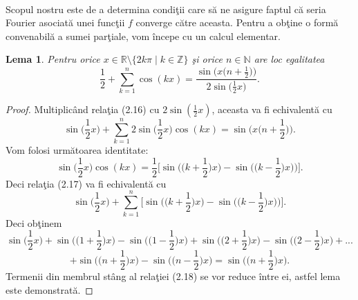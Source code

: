 \documentclass[a4paper,openany,12pt]{report}
\newtheorem{lemma}{Lema}[section]
\begin{document}
\paragraph*{}Scopul nostru este de a determina condi\c tii care s\u a ne asigure faptul c\u a seria Fourier asociat\u a unei func\c tii $f$ converge c\u atre aceasta. Pentru a ob\c tine o form\u a convenabil\u a a sumei par\c tiale, vom \^ incepe cu un calcul elementar. 
\begin{lemma}Pentru orice $x \in \mathbb{R}\setminus \{2k\pi \mid k \in \mathbb{Z}\}$ \c si orice $n \in \mathbb{N}$ are loc egalitatea
\begin{equation}
\frac{1}{2} + \sum_{k=1}^{n}\cos(kx) = \frac{\sin\Big(x\big(n + \frac{1}{2}\big)\Big)}{2\sin\Big(\frac{1}{2}x\Big)}.
\end{equation}
\end{lemma}
\begin{proof} 
Multiplic\^ and rela\c tia (2.16) cu $2\sin(\frac{1}{2}x)$, aceasta va fi echivalent\u a cu
\begin{equation}
\sin\Big(\frac{1}{2}x\Big) + \sum_{k=1}^n 2\sin\Big(\frac{1}{2}x\Big)\cos(kx)  = \sin\Big(x\Big(n + \frac{1}{2}\Big)\Big).
\end{equation}
Vom folosi urm\u atoarea identitate:
\begin{equation*}
\sin\Big(\frac{1}{2}x\Big)\cos(kx) = \frac{1}{2}\Big[\sin\Big(\Big(k + \frac{1}{2}\Big)x\Big) - \sin\Big(\Big(k - \frac{1}{2}\Big)x\Big)\Big) \Big].
\end{equation*}
Deci rela\c tia (2.17) va fi echivalent\u a cu
\begin{equation*}
\sin\Big(\frac{1}{2}x\Big) + \sum_{k=1}^{n}{\Big[\sin\Big(\Big(k + \frac{1}{2}\Big)x\Big) - \sin\Big(\Big(k - \frac{1}{2}\Big)x\Big)\Big) \Big]}. 
\end{equation*}
Deci ob\c tinem
\begin{equation*}
\sin\Big(\frac{1}{2}x\Big) + \sin\Big(\Big(1+\frac{1}{2}\Big)x\Big) - \sin\Big(\Big(1-\frac{1}{2}\Big)x\Big)  + \sin\Big(\Big(2+\frac{1}{2}\Big)x\Big) -\sin\Big(\Big(2-\frac{1}{2}\Big)x\Big) + ... 
\end{equation*}
\begin{equation}
+\sin\Big(\Big(n+\frac{1}{2}\Big)x\Big)  - \sin\Big(\Big(n-\frac{1}{2}\Big)x\Big)  = \sin\Big(\Big(n+\frac{1}{2}\Big)x\Big).
\end{equation}
Termenii din membrul st\^ ang al rela\c tiei (2.18) se vor reduce \^ intre ei, astfel lema este demonstrat\u a.
\end{proof}
\end{document}
